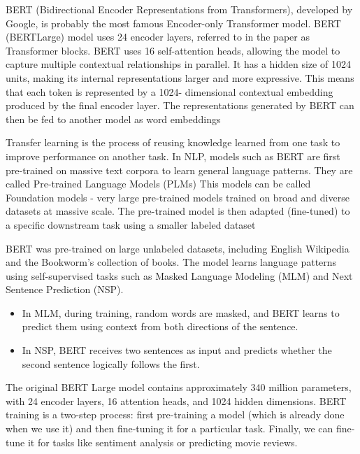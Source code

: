 \vspace{10pt}

BERT (Bidirectional Encoder Representations from Transformers),
developed by Google, is probably the most famous Encoder-only
Transformer model.
BERT (BERTLarge) model uses 24 encoder layers, referred to in the paper as
Transformer blocks.
BERT uses 16 self-attention heads, allowing the model to capture multiple
contextual relationships in parallel.
It has a hidden size of 1024 units, making its internal representations larger
and more expressive. This means that each token is represented by a 1024-
dimensional contextual embedding produced by the final encoder layer.
The representations generated by BERT can then be fed to another model
as word embeddings

\vspace{10pt}

Transfer learning is the process of reusing knowledge learned from one task to improve
performance on another task.
In NLP, models such as BERT are first pre-trained on massive text corpora to learn general
language patterns. They are called Pre-trained Language Models (PLMs)
This models can be called Foundation models - very large pre-trained models trained on
broad and diverse datasets at massive scale.
The pre-trained model is then adapted (fine-tuned) to a specific downstream task using a
smaller labeled dataset


\noindent BERT was pre-trained on large unlabeled datasets, including English Wikipedia and the Bookworm's collection of books. The model learns language patterns using self-supervised tasks such as Masked Language Modeling (MLM) and Next Sentence Prediction (NSP).

\begin{itemize}
    \item In MLM, during training, random words are masked, and BERT learns to predict them using context from both directions of the sentence.
    \item In NSP, BERT receives two sentences as input and predicts whether the second sentence logically follows the first.
\end{itemize}

\noindent The original BERT Large model contains approximately 340 million parameters, with 24 encoder layers, 16 attention heads, and 1024 hidden dimensions. BERT training is a two-step process: first pre-training a model (which is already done when we use it) and then fine-tuning it for a particular task. Finally, we can fine-tune it for tasks like sentiment analysis or predicting movie reviews.

